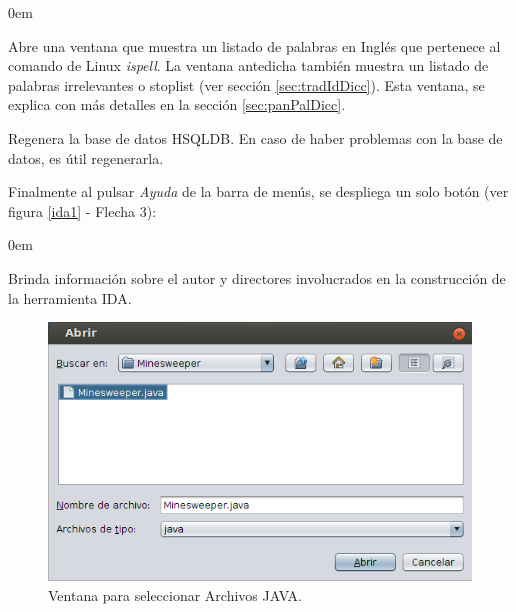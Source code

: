 \documentclass[a4paper,12pt]{report}
\begin{document}
\begin{description}
\itemsep0em%

\item[Ver Diccionarios:] Abre una ventana que muestra un listado de palabras en Inglés que pertenece al comando de Linux \textit{ispell}. %
La ventana antedicha también muestra un listado de palabras irrelevantes o stoplist (ver sección \ref{sec:tradIdDicc}). Esta ventana, se explica con más detalles en la sección \ref{sec:panPalDicc}.


\item[Restablecer B.D.(Base de Datos):] Regenera la base de datos HSQLDB. En caso de haber problemas con la base de datos, es útil regenerarla.

\end{description}

Finalmente al pulsar \textit{Ayuda} de la barra de menús, se despliega un solo botón (ver figura \ref{ida1} - Flecha 3):

\begin{description}
\itemsep0em%
\item[Acerca de:] Brinda información sobre el autor y directores involucrados en la construcción de la herramienta IDA.
\end{description}

\begin{figure}[t] %
\centerline{%
\includegraphics[scale= 0.7]{./ida_02.png}
}
\caption{Ventana para seleccionar Archivos JAVA.}
\label{ida2}
\end{figure}
\end{document}
